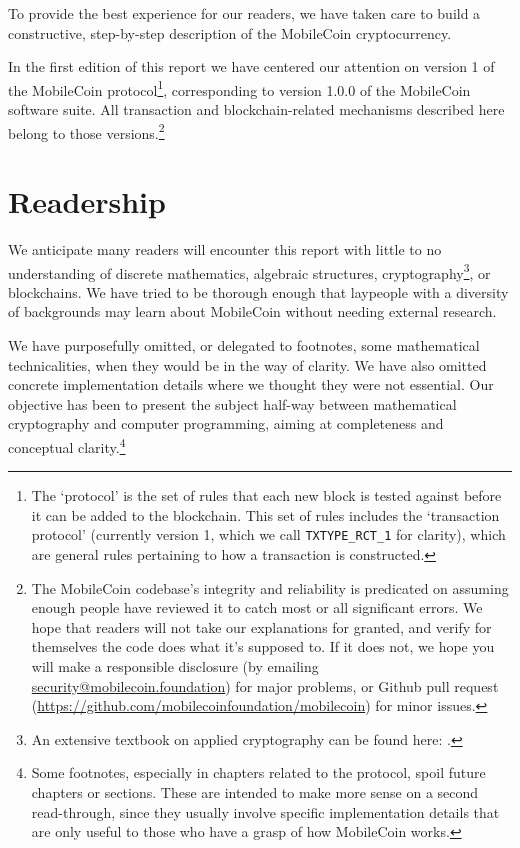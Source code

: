 To provide the best experience for our readers, we have taken care to build a constructive, step-by-step description of the MobileCoin cryptocurrency.

In the first edition of this report we have centered our attention on version 1 of the MobileCoin protocol\footnote{The `protocol' is the set of rules that each new block is tested against before it can be added to the blockchain. This set of rules includes the `transaction protocol' (currently version 1, which we call {\tt TXTYPE\_RCT\_1} for clarity), which are general rules pertaining to how a transaction is constructed.}, corresponding to version 1.0.0 of the MobileCoin software suite. All transaction and blockchain-related mechanisms described here belong to those versions.\footnote{The MobileCoin codebase's integrity and reliability is predicated on assuming enough people have reviewed it to catch most or all significant errors. We hope that readers will not take our explanations for granted, and verify for themselves the code does what it's supposed to. If it does not, we hope you will make a responsible disclosure (by emailing \url{security@mobilecoin.foundation}) for major problems, or Github pull request (\url{https://github.com/mobilecoinfoundation/mobilecoin}) for minor issues.}%



\section{Readership}

We anticipate many readers will encounter this report with little to no understanding of discrete mathematics, algebraic structures, cryptography\footnote{An extensive textbook on applied cryptography can be found here: \cite{applied-cryptography-textbook}.}, or blockchains. We have tried to be thorough enough that laypeople with a diversity of backgrounds may learn about MobileCoin without needing external research.

We have purposefully omitted, or delegated to footnotes, some mathematical technicalities, when they would be in the way of clarity. We have also omitted concrete implementation details where we thought they were not essential. Our objective has been to present the subject half-way between mathematical cryptography and computer programming, aiming at completeness and conceptual clarity.\footnote{Some footnotes, especially in chapters related to the protocol, spoil future chapters or sections. These are intended to make more sense on a second read-through, since they usually involve specific implementation details that are only useful to those who have a grasp of how MobileCoin works.}



